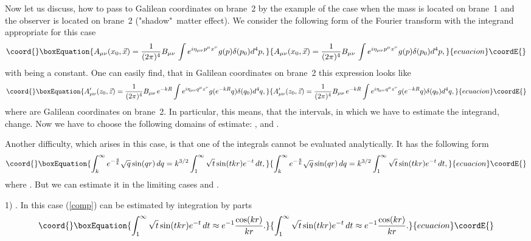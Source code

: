 \documentclass[a4paper,12pt]{article}
\begin{document}
Now let us discuss, how to pass to Galilean coordinates on brane~2
by the example of the case when the mass is located on brane~1 and
the observer is located on brane~2 ("shadow"\ matter effect). We
consider the following form of the Fourier transform with the
integrand   appropriate for this case
\begin{equation}\coord{}\boxEquation{
A_{\mu\nu}(x_0,\vec x)=\frac{1}{(2\pi)^4} B_{\mu\nu} \,\int
e^{i\eta_{\mu\nu}p^{\mu}x^{\nu}}g(p)\delta(p_0) d^{4}p,
}{
A_{\mu\nu}(x_0,\vec x)=\frac{1}{(2\pi)^4} B_{\mu\nu} \,\int
e^{i\eta_{\mu\nu}p^{\mu}x^{\nu}}g(p)\delta(p_0) d^{4}p,
}{ecuacion}\coordE{}\end{equation}
with \coordHE{} being a constant. One can easily find, that
in Galilean coordinates on brane~2 this expression looks like
\begin{equation}\coord{}\boxEquation{
A'_{\mu\nu}(z_0,\vec z)=\frac{1}{(2\pi)^4} B_{\mu\nu}\, e^{-kR}\int
e^{i\eta_{\mu\nu}q^{\mu}z^{\nu}}g(e^{-kR}q)\delta(q_0) d^{4}q,
}{
A'_{\mu\nu}(z_0,\vec z)=\frac{1}{(2\pi)^4} B_{\mu\nu}\, e^{-kR}\int
e^{i\eta_{\mu\nu}q^{\mu}z^{\nu}}g(e^{-kR}q)\delta(q_0) d^{4}q,
}{ecuacion}\coordE{}\end{equation}
where \coordHE{} are Galilean coordinates on brane~2. In particular,
this means, that the intervals, in which we have to estimate the
integrand, change. Now we have to choose the following domains of
estimate: \coordHE{}, \coordHE{} and \coordHE{}.

Another difficulty, which arises in this case, is that one of the integrals
cannot be evaluated analytically. It has the following form
\begin{equation}\coord{}\boxEquation{\label{comp}
\int_k^\infty
e^{-\frac{q}{k}}\sqrt{q}\sin(qr)\,dq=k^{3/2}\int_1^\infty
\sqrt{t}\sin(tkr)e^{-t}\,dt,
}{\int_k^\infty
e^{-\frac{q}{k}}\sqrt{q}\sin(qr)\,dq=k^{3/2}\int_1^\infty
\sqrt{t}\sin(tkr)e^{-t}\,dt,
}{ecuacion}\coordE{}\end{equation}
where \coordHE{}. But we can estimate it in the
limiting cases \coordHE{} and \coordHE{}.

1) \coordHE{}. In this case (\ref{comp}) can be estimated by
integration by parts
\begin{equation}\coord{}\boxEquation{
\int_1^\infty \sqrt{t}\sin(tkr)e^{-t}\,dt\approx
e^{-1}\frac{\cos(kr)}{kr}.
}{
\int_1^\infty \sqrt{t}\sin(tkr)e^{-t}\,dt\approx
e^{-1}\frac{\cos(kr)}{kr}.
}{ecuacion}\coordE{}\end{equation}
\end{document}
